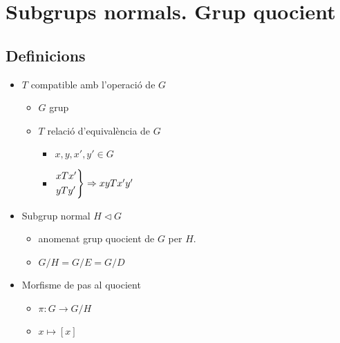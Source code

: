 \section{Subgrups normals. Grup quocient}
\subsection*{Definicions}
\begin{itemize}
\item $T$ compatible amb l'operació de $G$
	\begin{itemize}
	\item $G$ grup
	\item $T$ relació d'equivalència de $G$
		\begin{itemize}
		\item $x, y, x', y' \in G$
		\item 	$
			\begin{rcases}
			xTx'\\yTy'
			\end{rcases}
			\Rightarrow xyTx'y'
			$
		\end{itemize}
	\end{itemize}
\item Subgrup normal $H \triangleleft G$
	\begin{itemize}
	\item anomenat grup quocient de $G$ per $H$.
	\item $G/H = G/E = G/D$
	\end{itemize}
\item Morfisme de pas al quocient
	\begin{itemize}
	\item $\pi:G \to G/H$
	\item $x \mapsto [x]$
	\end{itemize}
\end{itemize}

